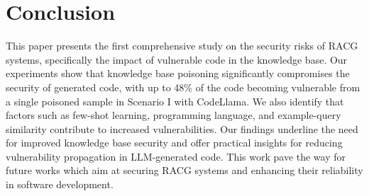\section{Conclusion}
This paper presents the first comprehensive study on the security risks of RACG systems, specifically the impact of vulnerable code in the knowledge base. Our experiments show that knowledge base poisoning significantly compromises the security of generated code, with up to 48\% of the code becoming vulnerable from a single poisoned sample in Scenario I with CodeLlama. We also identify that factors such as few-shot learning, programming language, and example-query similarity contribute to increased vulnerabilities. Our findings underline the need for improved knowledge base security and offer practical insights for reducing vulnerability propagation in LLM-generated code. This work pave the way for future works which aim at securing RACG systems and enhancing their reliability in software development.